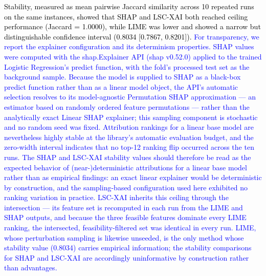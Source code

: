 \documentclass[a4paper,fleqn]{cas-sc}
\begin{document}
\textcolor{black}{Stability, measured as mean pairwise Jaccard similarity across 10 repeated runs on the same instances, showed that SHAP and LSC-XAI both reached ceiling performance (Jaccard = 1.0000), while LIME was lower and showed a narrow but distinguishable confidence interval (0.8034 [0.7867, 0.8201]). \textcolor{blue}{For transparency, we report the explainer configuration and its determinism properties. SHAP values were computed with the shap.Explainer API (shap v0.52.0) applied to the trained Logistic Regression's predict function, with the fold's processed test set as the background sample. Because the model is supplied to SHAP as a black-box predict function rather than as a linear model object, the API's automatic selection resolves to its model-agnostic Permutation SHAP approximation — an estimator based on randomly ordered feature permutations — rather than the analytically exact Linear SHAP explainer; this sampling component is stochastic and no random seed was fixed. Attribution rankings for a linear base model are nevertheless highly stable at the library's automatic evaluation budget, and the zero-width interval indicates that no top-12 ranking flip occurred across the ten runs. The SHAP and LSC-XAI stability values should therefore be read as the expected behavior of (near-)deterministic attributions for a linear base model rather than as empirical findings: an exact linear explainer would be deterministic by construction, and the sampling-based configuration used here exhibited no ranking variation in practice. LSC-XAI inherits this ceiling through the intersection — its feature set is recomputed in each run from the LIME and SHAP outputs, and because the three feasible features dominate every LIME ranking, the intersected, feasibility-filtered set was identical in every run. LIME, whose perturbation sampling is likewise unseeded, is the only method whose stability value (0.8034) carries empirical information; the stability comparisons for SHAP and LSC-XAI are accordingly uninformative by construction rather than advantages.}}
\end{document}
